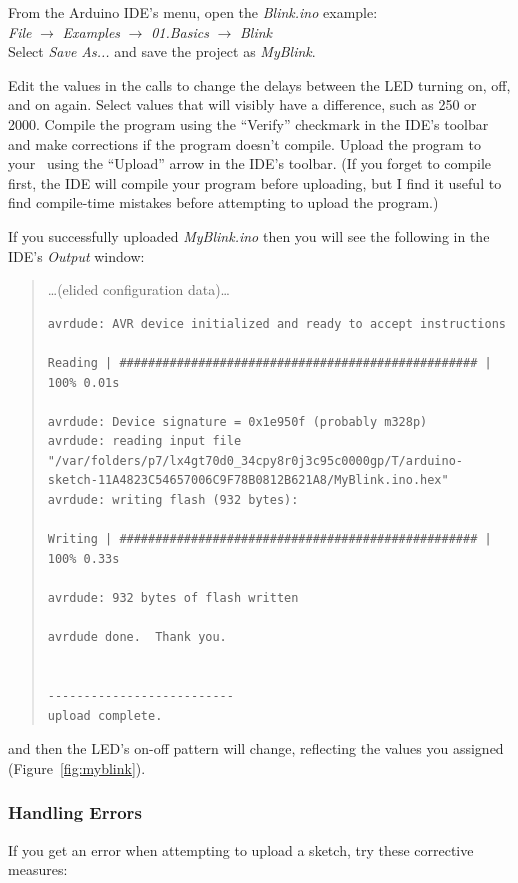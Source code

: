 From the Arduino IDE's menu, open the \textit{Blink.ino} example: \\
\textit{File} $\rightarrow$ \textit{Examples} $\rightarrow$ \textit{01.Basics} $\rightarrow$ \textit{Blink} \\
Select \textit{Save As...} and save the project as \textit{MyBlink}.

Edit the values in the  calls to change the delays between the
LED turning on, off, and on again. Select values that will visibly have a
difference, such as 250 or 2000. Compile the program using the ``Verify''
checkmark in the IDE's toolbar and make corrections if the program doesn't
compile. Upload the program to your \nano\ using the ``Upload'' arrow in the
IDE's toolbar. (If you forget to compile first, the IDE will compile your
program before uploading, but I find it useful to find compile-time mistakes
before attempting to upload the program.)

If you successfully uploaded \textit{MyBlink.ino} then you will see the
following in the IDE's \textit{Output} window:
\begin{quote}
\dots (elided configuration data)\dots
\begin{verbatim}
avrdude: AVR device initialized and ready to accept instructions

Reading | ################################################## | 100% 0.01s

avrdude: Device signature = 0x1e950f (probably m328p)
avrdude: reading input file "/var/folders/p7/lx4gt70d0_34cpy8r0j3c95c0000gp/T/arduino-sketch-11A4823C54657006C9F78B0812B621A8/MyBlink.ino.hex"
avrdude: writing flash (932 bytes):

Writing | ################################################## | 100% 0.33s

avrdude: 932 bytes of flash written

avrdude done.  Thank you.


--------------------------
upload complete.
\end{verbatim}\end{quote}
and then the LED's on-off pattern will change, reflecting the 
values you assigned (Figure~\ref{fig:myblink}).

\subsubsection*{Handling Errors}

If you get an error when attempting to upload a sketch, try these corrective
measures:

